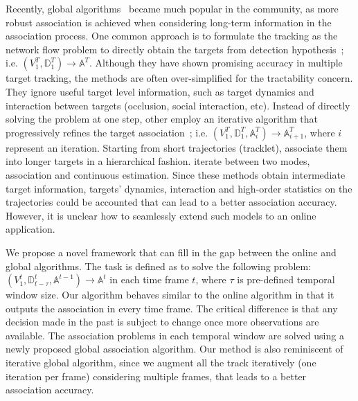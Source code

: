 \documentclass[10pt,twocolumn,letterpaper]{article}
\begin{document}
Recently, global algorithms~\cite{Andriyenko:2012:DCO,BerclazFTF11,Milan:2014:CEM,Pirsiavash_CVPR_11,Zhang_CVPR_08} became much popular in the community, as more robust association is achieved when considering long-term information in the association process. One common approach is to formulate the tracking as the network flow problem to directly obtain the targets from detection hypothesis~\cite{BerclazFTF11,Pirsiavash_CVPR_11,Zhang_CVPR_08}; i.e. $(V_1^T, \mathbb{D}_1^T) \rightarrow \mathbb{A}^T$. Although they have shown promising accuracy in multiple target tracking, the methods are often over-simplified for the tractability concern. They ignore useful target level information, such as target dynamics and interaction between targets (occlusion, social interaction, etc). Instead of directly solving the problem at one step, other employ an iterative algorithm that progressively refines the target association~\cite{Andriyenko:2012:DCO,huang2008robust,Kuo_CVPR_10,Milan:2014:CEM}; i.e. $(V_1^T, \mathbb{D}_1^T, \mathbb{A}_{i}^T) \rightarrow \mathbb{A}_{i+1}^T$, where $i$ represent an iteration. Starting from short trajectories (tracklet), \cite{huang2008robust,Kuo_CVPR_10} associate them into longer targets in a hierarchical fashion. \cite{Andriyenko:2012:DCO,Milan:2014:CEM} iterate between two modes, association and continuous estimation. Since these methods obtain intermediate target information, targets' dynamics, interaction and high-order statistics on the trajectories could be accounted that can lead to a better association accuracy. However, it is unclear how to seamlessly extend such models to an online application.

We propose a novel framework that can fill in the gap between the online and global algorithms. The task is defined as to solve the following problem: $(V_{1}^t, \mathbb{D}_{t-\tau}^t, \mathbb{A}^{t-1}) \rightarrow \mathbb{A}^t$ in each time frame $t$, where $\tau$ is pre-defined temporal window size. Our algorithm behaves similar to the online algorithm in that it outputs the association in every time frame. 
The critical difference is that any decision made in the past is subject to change once more observations are available. The association problems in each temporal window are solved using a newly proposed global association algorithm. Our method is also reminiscent of iterative global algorithm, since we augment all the track iteratively (one iteration per frame) considering multiple frames, that leads to a better association accuracy. 
\end{document}
